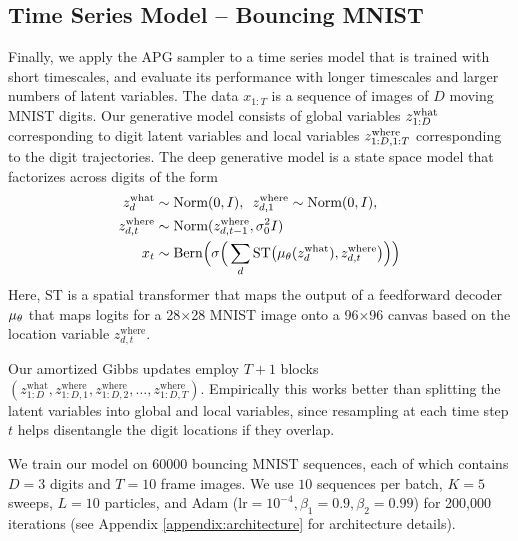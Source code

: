 \documentclass{article}
\theoremstyle{definition}
\begin{document}
\subsection{Time Series Model -- Bouncing MNIST}
Finally, we apply the APG sampler to a time series model that is trained with short timescales, and evaluate its performance with longer timescales and larger numbers of latent variables.
The data $x_{1:T}$ is a sequence of images of $D$ moving MNIST digits.
Our generative model consists of global variables $z_{1:D}^{\mathrm{what}}$ corresponding to digit latent variables and local variables $z_{1:D, 1:T}^{\mathrm{where}}$ corresponding to the digit trajectories.
The deep generative model is a state space model that factorizes across digits of the form
\begin{align*}
    z^{\mathrm{what}}_{d} 
    &\sim 
    \text{Norm}(0, I), 
    \,\,\, 
    z^{\mathrm{where}}_{d, 1} \sim \text{Norm}(0, I), 
    \\
    z^{\mathrm{where}}_{d, t} 
    &\sim 
    \text{Norm}(z^{\mathrm{where}}_{d, t - 1}, \sigma^2_0 I) 
    \\
    x_t 
    &\sim
    \mathrm{Bern}
    \Big(
        \sigma
        \Big(
            \sum_{d} \mathrm{ST}
            \big(
                \mu_\theta(z^{\mathrm{what}}_d), 
                z^{\mathrm{where}}_{d, t}
            \big)
        \Big)
    \Big)
\end{align*}
Here, ST is a spatial transformer \cite{jaderberg2015spatial} that maps the output of a feedforward decoder $\mu_\theta$ that maps logits for a 28$\times$28 MNIST image onto a 96$\times$96 canvas based on the location variable $z^{\mathrm{where}}_{d, t}$. 

Our amortized Gibbs updates employ $T + 1$ blocks $(z_{1:D}^{\mathrm{what}}, z_{1:D, 1}^{\mathrm{where}}, z_{1:D, 2}^{\mathrm{where}}, \dotsc, z_{1:D, T}^{\mathrm{where}})$.
Empirically this works better than splitting the latent variables into global and local variables, since resampling at each time step $t$ helps disentangle the digit locations if they overlap.

We train our model on 60000 bouncing MNIST sequences, each of which contains $D=3$ digits and $T=10$ frame images. We use $10$ sequences per batch, $K=5$ sweeps, $L=10$ particles, and Adam ($\mathrm{lr} = 10^{-4}, \beta_1 = 0.9, \beta_2 = 0.99$) for 200,000 iterations (see Appendix \ref{appendix:architecture} for architecture details).
\end{document}
